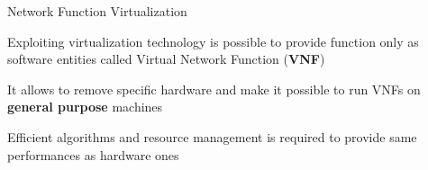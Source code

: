 \begin{frame}{Network Function Virtualization}

  Exploiting virtualization technology is possible to provide function only as
  software entities called Virtual Network Function (\textbf{VNF})

  \vfill{}

  It allows to remove specific hardware and make it possible to run VNFs on
  \textbf{general purpose} machines

  \vfill{}

  Efficient algorithms and resource management is required to provide same
  performances as hardware ones

  \vfill{}

\end{frame}